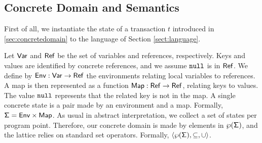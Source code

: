 \subsection{Concrete Domain and Semantics}
\label{sec:concretemap}
First of all, we instantiate the state of a transaction $t$ introduced in \ref{sec:concretedomain} to the language of Section \ref{sect:language}.

Let $\mathsf{Var}$ and $\mathsf{Ref}$ be the set of variables and references, respectively. Keys and values are identified by concrete references, and we assume $\mathtt{null}$ is in $\mathsf{Ref}$. We define by $\mathsf{Env} : \mathsf{Var} \to \mathsf{Ref}$ the environments relating local variables to references. A map is then represented as a function $\mathsf{Map} : \mathsf{Ref} \to \mathsf{Ref}$, relating keys to values. The value $\mathtt{null}$ represents that the related key is not in the map. A single concrete state is a pair made by an environment and a map. Formally, $\mathsf{\Sigma} = \mathsf{Env} \times \mathsf{Map}$. As usual in abstract interpretation, we collect a set of states per program point. Therefore, our concrete domain is made by elements in $\wp(\mathsf{\Sigma})$, and the lattice relies on standard set operators. Formally, $\langle \wp(\mathsf{\Sigma}), \subseteq, \cup \rangle$.



